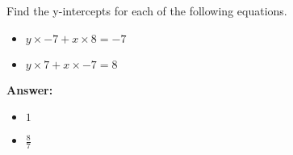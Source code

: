  Find the y-intercepts for each of the following equations. \begin{itemize}\item \( y \times -7 + x \times 8 = -7 \)\item \( y \times 7 + x \times -7 = 8 \)\end{itemize}

        \textbf{Answer:} \begin{itemize}\item \( 1 \)\item \( \frac{8}{7} \)\end{itemize}
